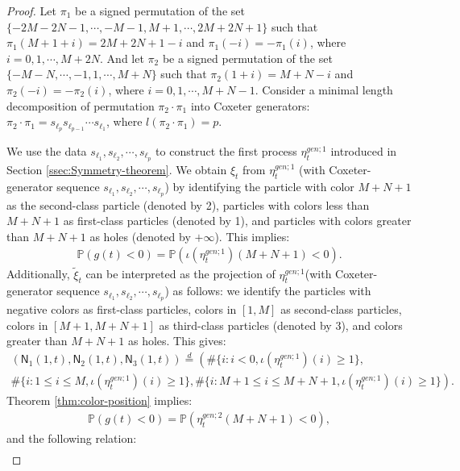 \documentclass[12pt,a4paper]{amsart}
\theoremstyle{remark}
\numberwithin{equation}{section} \numberwithin{theorem}{section}
\begin{document}
\begin{proof}

Let $\pi_1$ be a signed permutation of the set $\{-2M-2N-1, \cdots, -M-1, M+1, \cdots, 2M+2N+1\}$ such that $\pi_1(M+1+i)=2M+2N+1-i$ and $\pi_1(-i)=-\pi_1(i)$, where $i=0,1,\cdots, M+2N$. And let $\pi_2$ be a signed permutation of the set $\{-M-N, \cdots, -1, 1, \cdots, M+N\}$ such that $\pi_2(1+i)=M+N-i$ and $\pi_2(-i)=-\pi_2(i)$, where $i=0,1,\cdots, M+N-1$. Consider a minimal length decomposition of permutation $\pi_2 \cdot \pi_1$ into Coxeter generators: $\pi_2 \cdot \pi_1=s_{\ell_p}s_{\ell_{p-1}} \cdots s_{\ell_1}$, where $l(\pi_2 \cdot \pi_1)=p$.

We use the data $s_{\ell_1}, s_{\ell_2}, \cdots,s_{\ell_p}$ to construct the first process $\eta_{t}^{gen;1}$ introduced in Section \ref{ssec:Symmetry-theorem}.  We obtain $\xi_{t}$ from $\eta_{t}^{gen;1}$ (with Coxeter-generator sequence $s_{\ell_1}, s_{\ell_2}, \cdots,s_{\ell_p}$) by identifying the particle with color $M+N+1$ as the second-class particle (denoted by 2), particles with colors less than $M+N+1$ as first-class particles (denoted by 1), and particles with colors greater than $M+N+1$ as holes (denoted by $+\infty$). This implies:
\begin{align*}
\mathbb{P}(g(t)<0)=\mathbb{P}(\iota( \eta_{t}^{gen;1})(M+N+1)<0).
\end{align*}
Additionally, $\tilde\xi_{t}$ can be interpreted as the projection of $\eta_{t}^{gen;1}$(with Coxeter-generator sequence $s_{\ell_1}, s_{\ell_2}, \cdots,s_{\ell_p}$) as follows: we identify the particles with negative colors as first-class particles, colors in $[1, M]$ as second-class particles, colors in $[M+1, M+N+1]$ as third-class particles (denoted by 3), and colors greater than $M+N+1$ as holes. This gives:
\begin{multline*}
\left(\mathsf{N}_{1} (1,t) , \mathsf{N}_{2} (1,t), \mathsf{N}_{3} (1,t) \right) \stackrel{d}{=} \left( \#\{i: i<0, \iota( \eta_{t}^{gen;1})(i) \geq 1\}, \right. \\ 
\left. \#\{i: 1 \leq i \leq M, \iota( \eta_{t}^{gen;1})(i) \geq 1\},  \#\{i: M+1 \leq i \leq M+N+1, \iota( \eta_{t}^{gen;1})(i) \geq 1\}\right).
\end{multline*}
Theorem \ref{thm:color-position} implies:
\begin{align*}
\mathbb{P}(g(t)<0)=\mathbb{P}(\eta_{t}^{gen;2}(M+N+1)<0),
\end{align*}
and the following relation:
\begin{multline}
\label{eq:joint}

\end{multline}
\end{proof}
\end{document}
